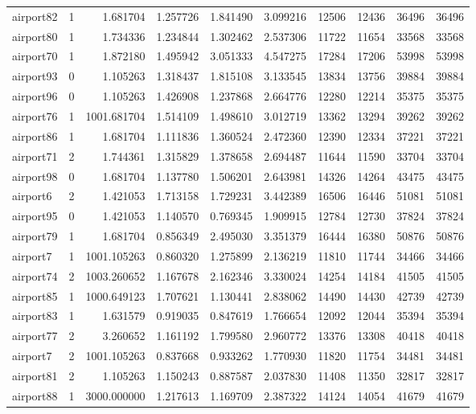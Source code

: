 \begin{longtable}{|l|r|r|r|r|r|r|r|r|r|}
airport82 & 1 & 1.681704 & 1.257726 & 1.841490 & 3.099216 & 12506 & 12436 & 36496 & 36496 \\
airport80 & 1 & 1.734336 & 1.234844 & 1.302462 & 2.537306 & 11722 & 11654 & 33568 & 33568 \\
airport70 & 1 & 1.872180 & 1.495942 & 3.051333 & 4.547275 & 17284 & 17206 & 53998 & 53998 \\
airport93 & 0 & 1.105263 & 1.318437 & 1.815108 & 3.133545 & 13834 & 13756 & 39884 & 39884 \\
airport96 & 0 & 1.105263 & 1.426908 & 1.237868 & 2.664776 & 12280 & 12214 & 35375 & 35375 \\
airport76 & 1 & 1001.681704 & 1.514109 & 1.498610 & 3.012719 & 13362 & 13294 & 39262 & 39262 \\
airport86 & 1 & 1.681704 & 1.111836 & 1.360524 & 2.472360 & 12390 & 12334 & 37221 & 37221 \\
airport71 & 2 & 1.744361 & 1.315829 & 1.378658 & 2.694487 & 11644 & 11590 & 33704 & 33704 \\
airport98 & 0 & 1.681704 & 1.137780 & 1.506201 & 2.643981 & 14326 & 14264 & 43475 & 43475 \\
airport6 & 2 & 1.421053 & 1.713158 & 1.729231 & 3.442389 & 16506 & 16446 & 51081 & 51081 \\
airport95 & 0 & 1.421053 & 1.140570 & 0.769345 & 1.909915 & 12784 & 12730 & 37824 & 37824 \\
airport79 & 1 & 1.681704 & 0.856349 & 2.495030 & 3.351379 & 16444 & 16380 & 50876 & 50876 \\
airport7 & 1 & 1001.105263 & 0.860320 & 1.275899 & 2.136219 & 11810 & 11744 & 34466 & 34466 \\
airport74 & 2 & 1003.260652 & 1.167678 & 2.162346 & 3.330024 & 14254 & 14184 & 41505 & 41505 \\
airport85 & 1 & 1000.649123 & 1.707621 & 1.130441 & 2.838062 & 14490 & 14430 & 42739 & 42739 \\
airport83 & 1 & 1.631579 & 0.919035 & 0.847619 & 1.766654 & 12092 & 12044 & 35394 & 35394 \\
airport77 & 2 & 3.260652 & 1.161192 & 1.799580 & 2.960772 & 13376 & 13308 & 40418 & 40418 \\
airport7 & 2 & 1001.105263 & 0.837668 & 0.933262 & 1.770930 & 11820 & 11754 & 34481 & 34481 \\
airport81 & 2 & 1.105263 & 1.150243 & 0.887587 & 2.037830 & 11408 & 11350 & 32817 & 32817 \\
airport88 & 1 & 3000.000000 & 1.217613 & 1.169709 & 2.387322 & 14124 & 14054 & 41679 & 41679 \\

\end{longtable}

